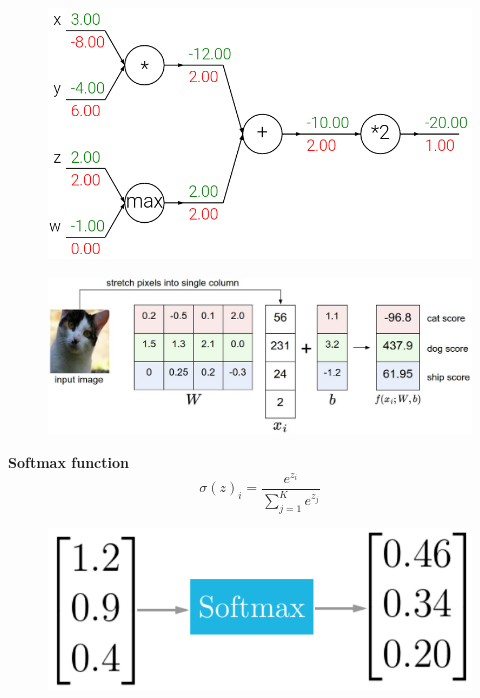 \documentclass[10pt, compress]{beamer}
\begin{document}
\begin{frame}
  \vspace{1cm}
  \begin{figure}
    \includegraphics[width=1\linewidth]{imgs/backprop_3}
  \end{figure}
\end{frame}

\begin{frame}
  \vspace{0.6cm}

  \begin{figure}
    \includegraphics[width=.85\linewidth]{imgs/softmax_1}
  \end{figure}

  \begin{multicols}{2}
    \textbf{Softmax function} \\
  $$ \sigma (z)_i = \frac{e^{z_i}}{\sum_{j=1}^K e^{z_j}}$$
  \columnbreak
  \begin{figure}
    \includegraphics[width=.9\linewidth]{imgs/softmax_3}
  \end{figure}

  \end{multicols}
\end{frame}
\end{document}
